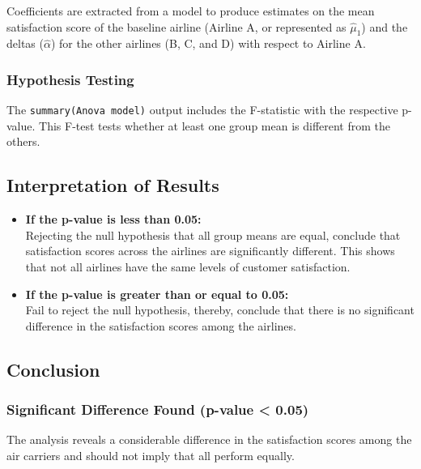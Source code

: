 \documentclass[
]{article}
\begin{document}
Coefficients are extracted from a model to produce estimates on the mean
satisfaction score of the baseline airline (Airline A, or represented as
\(\hat{\mu}_1\)) and the deltas (\(\hat{\alpha}\)) for the other
airlines (B, C, and D) with respect to Airline A.

\subsubsection{Hypothesis Testing}\label{hypothesis-testing}

The \texttt{summary(Anova\ model)} output includes the F-statistic with
the respective p-value. This F-test tests whether at least one group
mean is different from the others.

\subsection{Interpretation of Results}\label{interpretation-of-results}

\begin{itemize}
\item
  \textbf{If the p-value is less than 0.05:}\\
  Rejecting the null hypothesis that all group means are equal, conclude
  that satisfaction scores across the airlines are significantly
  different. This shows that not all airlines have the same levels of
  customer satisfaction.
\item
  \textbf{If the p-value is greater than or equal to 0.05:}\\
  Fail to reject the null hypothesis, thereby, conclude that there is no
  significant difference in the satisfaction scores among the airlines.
\end{itemize}

\subsection{Conclusion}\label{conclusion}

\subsubsection{Significant Difference Found (p-value \textless{}
0.05)}\label{significant-difference-found-p-value-0.05}

The analysis reveals a considerable difference in the satisfaction
scores among the air carriers and should not imply that all perform
equally.
\end{document}
